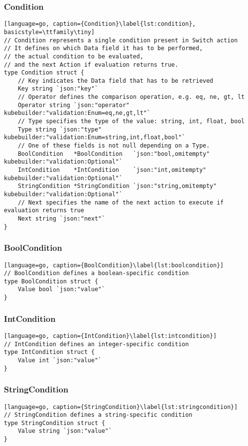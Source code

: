 \subsubsection{Condition}
\begin{lstlisting}[language=go, caption={Condition}\label{lst:condition}, basicstyle=\ttfamily\tiny]
// Condition represents a single condition present in Switch action
// It defines on which Data field it has to be performed, 
// the actual condition to be evaluated,
// and the next Action if evaluation returns true.
type Condition struct {
	// Key indicates the Data field that has to be retrieved
	Key string `json:"key"`
	// Operator defines the comparison operation, e.g. eq, ne, gt, lt
	Operator string `json:"operator" kubebuilder:"validation:Enum=eq,ne,gt,lt"`
	// Type specifies the type of the value: string, int, float, bool
	Type string `json:"type" kubebuilder:"validation:Enum=string,int,float,bool"`
	// One of these fields is not null depending on a Type.
	BoolCondition   *BoolCondition   `json:"bool,omitempty" kubebuilder:"validation:Optional"`
	IntCondition    *IntCondition    `json:"int,omitempty" kubebuilder:"validation:Optional"`
	StringCondition *StringCondition `json:"string,omitempty" kubebuilder:"validation:Optional"`
	// Next specifies the name of the next action to execute if evaluation returns true
	Next string `json:"next"`
}
\end{lstlisting}

\subsubsection{BoolCondition}
\begin{lstlisting}[language=go, caption={BoolCondition}\label{lst:boolcondition}]
// BoolCondition defines a boolean-specific condition
type BoolCondition struct {
	Value bool `json:"value"`
}
\end{lstlisting}

\subsubsection{IntCondition}
\begin{lstlisting}[language=go, caption={IntCondition}\label{lst:intcondition}]
// IntCondition defines an integer-specific condition
type IntCondition struct {
	Value int `json:"value"`
}
\end{lstlisting}

\subsubsection{StringCondition}
\begin{lstlisting}[language=go, caption={StringCondition}\label{lst:stringcondition}]
// StringCondition defines a string-specific condition
type StringCondition struct {
	Value string `json:"value"`
}
\end{lstlisting}
